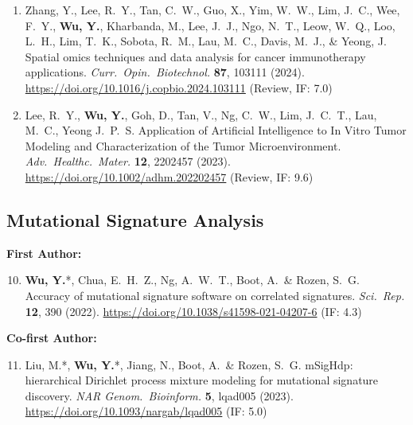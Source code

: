 \documentclass[11pt,a4paper]{article}
\begin{document}
\begin{enumerate}
\item Zhang, Y., Lee, R.\ Y., Tan, C.\ W., Guo, X., Yim, W.\ W., Lim, J.\ C., Wee, F.\ Y., \textbf{Wu, Y.}, Kharbanda, M., Lee, J.\ J., Ngo, N.\ T., Leow, W.\ Q., Loo, L.\ H., Lim, T.\ K., Sobota, R.\ M., Lau, M.\ C., Davis, M.\ J., \& Yeong, J. Spatial omics techniques and data analysis for cancer immunotherapy applications. \textit{Curr.\ Opin.\ Biotechnol.} \textbf{87}, 103111 (2024). \url{https://doi.org/10.1016/j.copbio.2024.103111} (Review, IF: 7.0)
\item Lee, R.\ Y., \textbf{Wu, Y.}, Goh, D., Tan, V., Ng, C.\ W., Lim, J.\ C.\ T., Lau, M.\ C., Yeong J.\ P.\ S. Application of Artificial Intelligence to In Vitro Tumor Modeling and Characterization of the Tumor Microenvironment. \textit{Adv.\ Healthc.\ Mater.} \textbf{12}, 2202457 (2023). \url{https://doi.org/10.1002/adhm.202202457} (Review, IF: 9.6)
\end{enumerate}

\subsection*{Mutational Signature Analysis}

\textbf{First Author:}
\begin{enumerate}\setcounter{enumi}{9}
\item \textbf{Wu, Y.}*, Chua, E.\ H.\ Z., Ng, A.\ W.\ T., Boot, A.\ \& Rozen, S.\ G. Accuracy of mutational signature software on correlated signatures. \textit{Sci.\ Rep.} \textbf{12}, 390 (2022). \url{https://doi.org/10.1038/s41598-021-04207-6} (IF: 4.3)
\end{enumerate}

\textbf{Co-first Author:}
\begin{enumerate}\setcounter{enumi}{10}
\item Liu, M.*, \textbf{Wu, Y.}*, Jiang, N., Boot, A.\ \& Rozen, S.\ G. mSigHdp: hierarchical Dirichlet process mixture modeling for mutational signature discovery. \textit{NAR Genom.\ Bioinform.} \textbf{5}, lqad005 (2023). \url{https://doi.org/10.1093/nargab/lqad005} (IF: 5.0)
\end{enumerate}
\end{document}
